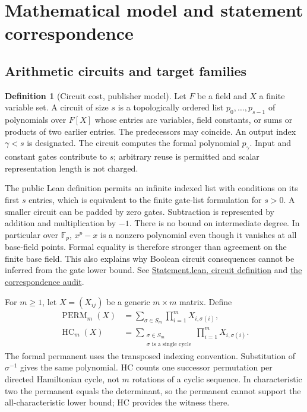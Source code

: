 \documentclass[11pt,letterpaper]{article}
\theoremstyle{definition}\newtheorem{definition}[theorem]{Definition}\newtheorem{example}[theorem]{Example}
\theoremstyle{remark}\newtheorem{remark}[theorem]{Remark}
\newcommand{\HC}{\operatorname{HC}}
\newcommand{\Perm}{\operatorname{PERM}}
\newcommand{\F}{\mathbb{F}}
\newcommand{\pub}[3]{\href{https://github.com/anthropics/formal-math/blob/11b6c7e3c927df2658f513b6b68ea7f8929c62c5/vp-vnp/#1\#L#2}{#3}}
\newcommand{\aud}[2]{\href{https://github.com/nousentllc/VP-VNP-Review/blob/567303d0bcf4f9d54390437b137752446e58ccd6/#1}{#2}}
\begin{document}
\section{Mathematical model and statement correspondence}\label{sec:model}
\subsection{Arithmetic circuits and target families}
\begin{definition}[Circuit cost, publisher model]
Let $F$ be a field and $X$ a finite variable set. A circuit of size $s$ is a topologically ordered list $p_0,\ldots,p_{s-1}$ of polynomials over $F[X]$ whose entries are variables, field constants, or sums or products of two earlier entries. The predecessors may coincide. An output index $\gamma<s$ is designated. The circuit computes the formal polynomial $p_\gamma$. Input and constant gates contribute to $s$; arbitrary reuse is permitted and scalar representation length is not charged.
\end{definition}
The public Lean definition permits an infinite indexed list with conditions on its first $s$ entries, which is equivalent to the finite gate-list formulation for $s>0$. A smaller circuit can be padded by zero gates. Subtraction is represented by addition and multiplication by $-1$. There is no bound on intermediate degree. In particular over $\F_p$, $x^p-x$ is a nonzero polynomial even though it vanishes at all base-field points. Formal equality is therefore stronger than agreement on the finite base field. This also explains why Boolean circuit consequences cannot be inferred from the gate lower bound. See \pub{Statement.lean}{23}{Statement.lean, circuit definition} and \aud{passes/statement-correspondence.md}{the correspondence audit}.

For $m\ge1$, let $X=(X_{ij})$ be a generic $m\times m$ matrix. Define
\begin{align}
\Perm_m(X)&=\sum_{\sigma\in S_m}\prod_{i=1}^m X_{i,\sigma(i)},\\
\HC_m(X)&=\sum_{\substack{\sigma\in S_m\\\sigma\text{ is a single cycle}}}\prod_{i=1}^m X_{i,\sigma(i)}.
\end{align}
The formal permanent uses the transposed indexing convention. Substitution of $\sigma^{-1}$ gives the same polynomial. HC counts one successor permutation per directed Hamiltonian cycle, not $m$ rotations of a cyclic sequence. In characteristic two the permanent equals the determinant, so the permanent cannot support the all-characteristic lower bound; HC provides the witness there.
\end{document}
